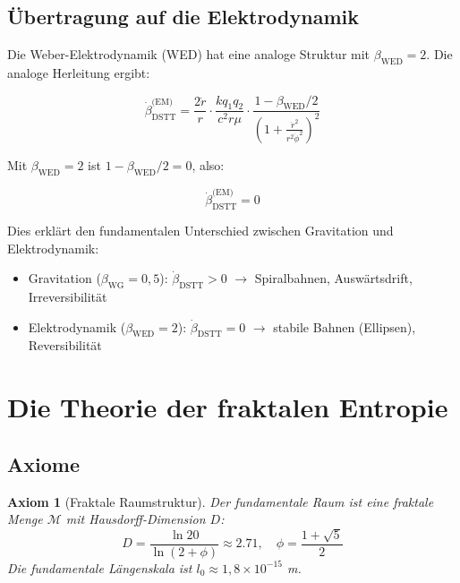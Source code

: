 \documentclass[12pt,a4paper]{article}
\newtheorem{axiom}{Axiom}[section]
\begin{document}
\subsection{Übertragung auf die Elektrodynamik}

Die Weber-Elektrodynamik (WED) hat eine analoge Struktur mit $\beta_{\text{WED}} = 2$. Die analoge Herleitung ergibt:

\begin{equation}
\dot{\beta}_{\text{DSTT}}^{\text{(EM)}} = \frac{2\dot{r}}{r} \cdot \frac{kq_1q_2}{c^2r\mu} \cdot \frac{1 - \beta_{\text{WED}}/2}{\left(1 + \frac{\dot{r}^2}{r^2\dot{\phi}^2}\right)^2}
\end{equation}

Mit $\beta_{\text{WED}} = 2$ ist $1 - \beta_{\text{WED}}/2 = 0$, also:

\begin{equation}
\dot{\beta}_{\text{DSTT}}^{\text{(EM)}} = 0
\end{equation}

Dies erklärt den fundamentalen Unterschied zwischen Gravitation und Elektrodynamik:
\begin{itemize}
\item Gravitation ($\beta_{\text{WG}} = 0,5$): $\dot{\beta}_{\text{DSTT}} > 0$ $\rightarrow$ Spiralbahnen, Auswärtsdrift, Irreversibilität
\item Elektrodynamik ($\beta_{\text{WED}} = 2$): $\dot{\beta}_{\text{DSTT}} = 0$ $\rightarrow$ stabile Bahnen (Ellipsen), Reversibilität
\end{itemize}

\section{Die Theorie der fraktalen Entropie}

\subsection{Axiome}

\begin{axiom}[Fraktale Raumstruktur]
Der fundamentale Raum ist eine fraktale Menge $\mathcal{M}$ mit Hausdorff-Dimension $D$:
\begin{equation}
D = \frac{\ln 20}{\ln(2 + \phi)} \approx 2.71, \quad \phi = \frac{1 + \sqrt{5}}{2}
\end{equation}
Die fundamentale Längenskala ist $l_0 \approx 1,8 \times 10^{-15}$ m.
\end{axiom}
\end{document}
